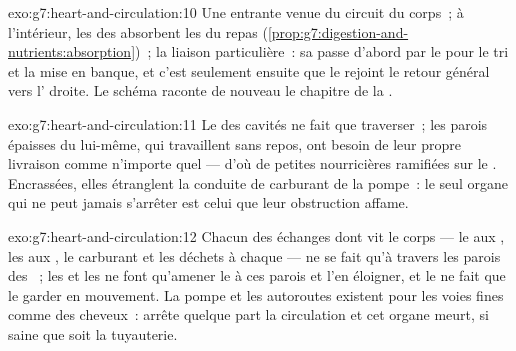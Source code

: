 \begin{solution}{exo:g7:heart-and-circulation:10}
Une  entrante venue du circuit du corps~; à l'intérieur, les
 des  absorbent les  du repas
(\cref{prop:g7:digestion-and-nutrients:absorption})~; la liaison
particulière~: sa  passe d'abord par le  pour le tri et la
mise en banque, et c'est seulement ensuite que le  rejoint le
retour général vers l' droite. Le schéma raconte de
nouveau le chapitre de la .
\end{solution}

\begin{solution}{exo:g7:heart-and-circulation:11}
Le  des cavités ne fait que traverser~; les parois épaisses du
 lui-même, qui travaillent sans repos, ont besoin de leur propre
livraison  comme n'importe quel  --- d'où de petites
 nourricières ramifiées sur le . Encrassées, elles
étranglent la conduite de carburant de la pompe~: le seul organe qui
ne peut jamais s'arrêter est celui que leur obstruction affame.
\end{solution}

\begin{solution}{exo:g7:heart-and-circulation:12}
Chacun des échanges dont vit le corps --- le  aux ,
les  aux , le carburant et les déchets à chaque
 --- ne se fait qu'à travers les parois des ~; les
 et les  ne font qu'amener le  à ces parois et
l'en éloigner, et le  ne fait que le garder en mouvement. La
pompe et les autoroutes existent pour les voies fines comme des
cheveux~: arrête quelque part la circulation  et cet
organe meurt, si saine que soit la tuyauterie.
\end{solution}

